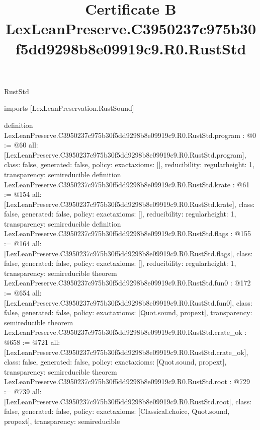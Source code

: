 \begin{lexlean}{RustStd}
\title{Certificate B LexLeanPreserve.C3950237c975b30f5dd9298b8e09919c9.R0.RustStd}
\begin{coremodule}
imports [LexLeanPreservation.RustSound]

definition LexLeanPreserve.C3950237c975b30f5dd9298b8e09919c9.R0.RustStd.program : @0 := @60 {
  all: [LexLeanPreserve.C3950237c975b30f5dd9298b8e09919c9.R0.RustStd.program],
  class: false,
  generated: false,
  policy: exact{axioms: []},
  reducibility: regular{height: 1},
  transparency: semireducible
}
definition LexLeanPreserve.C3950237c975b30f5dd9298b8e09919c9.R0.RustStd.krate : @61 := @154 {
  all: [LexLeanPreserve.C3950237c975b30f5dd9298b8e09919c9.R0.RustStd.krate],
  class: false,
  generated: false,
  policy: exact{axioms: []},
  reducibility: regular{height: 1},
  transparency: semireducible
}
definition LexLeanPreserve.C3950237c975b30f5dd9298b8e09919c9.R0.RustStd.flags : @155 := @164 {
  all: [LexLeanPreserve.C3950237c975b30f5dd9298b8e09919c9.R0.RustStd.flags],
  class: false,
  generated: false,
  policy: exact{axioms: []},
  reducibility: regular{height: 1},
  transparency: semireducible
}
theorem LexLeanPreserve.C3950237c975b30f5dd9298b8e09919c9.R0.RustStd.fun0 : @172 := @654 {
  all: [LexLeanPreserve.C3950237c975b30f5dd9298b8e09919c9.R0.RustStd.fun0],
  class: false,
  generated: false,
  policy: exact{axioms: [Quot.sound, propext]},
  transparency: semireducible
}
theorem LexLeanPreserve.C3950237c975b30f5dd9298b8e09919c9.R0.RustStd.crate_ok : @658 := @721 {
  all: [LexLeanPreserve.C3950237c975b30f5dd9298b8e09919c9.R0.RustStd.crate_ok],
  class: false,
  generated: false,
  policy: exact{axioms: [Quot.sound, propext]},
  transparency: semireducible
}
theorem LexLeanPreserve.C3950237c975b30f5dd9298b8e09919c9.R0.RustStd.root : @729 := @739 {
  all: [LexLeanPreserve.C3950237c975b30f5dd9298b8e09919c9.R0.RustStd.root],
  class: false,
  generated: false,
  policy: exact{axioms: [Classical.choice, Quot.sound, propext]},
  transparency: semireducible
}


\end{coremodule}
\end{lexlean}
